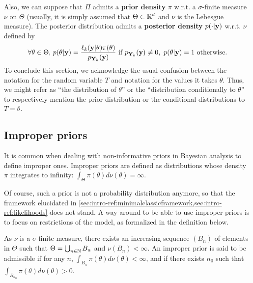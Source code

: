 Also, we can suppose that $\varPi$ admits a \textbf{prior density} $\pi$ w.r.t. a $\sigma$-finite measure $\nu$ on $\Theta$ (usually, it is simply assumed that $\Theta\subset\mathbb{R}^d$ and $\nu$ is the Lebesgue measure). 
The posterior distribution admits a \textbf{posterior density} $p(\cdot|\mathbf{y})$ w.r.t. $\nu$ defined by
    \begin{equation}
        \forall\theta\in\Theta,\, p(\theta|\mathbf{y}) = \frac{\ell_k(\mathbf{y}|\theta)\pi(\theta)}{p_{\mathbf{Y}_k}(\mathbf{y})}\text{\ if\ } p_{\mathbf{Y}_k}(\mathbf{y})\ne0,\ p(\theta|\mathbf{y})=1 \text{\ otherwise}.
    \end{equation}
To conclude this section, we acknowledge the usual confusion between the notation for the random variable $T$ and notation for the values it takes $\theta$. Thus, we might refer as ``the distribution of $\theta$'' or the ``distribution conditionally to $\theta$'' to respectively mention the prior distribution or the conditional distributions to $T=\theta$.


\subsection{Improper priors}\label{sec:intro-ref:improperway-around}

It is common when dealing with non-informative priors in Bayesian analysis to define improper ones.
Improper priors are defined as distributions whose density $\pi$ integrates to infinity: $\int_\Theta\pi(\theta)d\nu(\theta)=\infty$. 

Of course, such a prior is not a probability distribution anymore, so that the framework elucidated in \cref{sec:intro-ref:minimalclassicframework,sec:intro-ref:likelihoods} does not stand. 
A way-around to be able to use improper priors is to focus on restrictions of the model, %
as formalized in the definition below.
\begin{defi}
    As $\nu$ is a $\sigma$-finite measure, there exists an increasing sequence $(B_n)$ of elements in $\Theta$ such that 
$\Theta=\bigcup_{n\in\mathbb{N}}B_n$ and $\nu(B_n) <\infty$.
An improper prior is said to be admissible if for any $n$, $\int_{B_n}\pi(\theta)d\nu(\theta)<\infty$, and if there exists $n_0$ such that $\int_{B_{n_0}}\pi(\theta)d\nu(\theta)>0$.
\end{defi}

